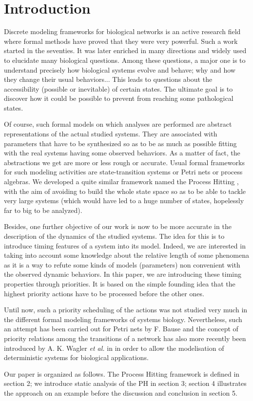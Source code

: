 \section{Introduction}
\label{sec:intro}

Discrete modeling frameworks for biological networks is an active research field where formal methods have proved that they were very powerful.
Such a work started in the seventies.
It was later enriched in many directions and widely used to elucidate many biological questions.
Among these questions, a major one is to understand precisely how biological systems evolve and behave; why and how they change their usual behaviors...
This leads to questions about the accessibility (possible or inevitable) of certain states.
The ultimate goal is to discover how it could be possible to prevent from reaching some pathological states.

Of course, such formal models on which analyses are performed are abstract representations of the actual studied systems.
They are associated with parameters that have to be synthesized so as to be as much as possible fitting with the real systems having some observed behaviors.
As a matter of fact, the abstractions we get are more or less rough or accurate.
Usual formal frameworks for such modeling activities are state-transition systems or Petri nets or process algebras.
We developed a quite similar framework named the Process Hitting \cite{PMR10-TCSB}, with the aim of avoiding to build the whole state space so as to be able to tackle very large systems (which would have led to a huge number of states, hopelessly far to big to be analyzed).

Besides, one further objective of our work is now to be more accurate in the description of the dynamics of the studied systems.
The idea for this is to introduce timing features of a system into its model.
Indeed, we are interested in taking into account some knowledge about the relative length of some phenomena as it is a way to refute some kinds of models (parameters) non convenient with the observed dynamic behaviors.
In this paper, we are introducing these timing properties through priorities.
It is based on the simple founding idea that the highest priority actions have to be processed before the other ones.

Until now, such a priority scheduling of the actions was not studied very much in the different formal modeling frameworks of systems biology.
Nevertheless, such an attempt has been carried out for Petri nets by F. Bause \cite{Bause97} and the concept of priority relations among the transitions of a network has also more recently been introduced by A. K. Wagler \textit{et al.} in \cite{waw,WaglerW12} in order to allow the modelisation of deterministic systems for biological applications.

Our paper is organized as follows.
The Process Hitting framework is defined in section 2;
we introduce static analysis of the PH in section 3;
section 4 illustrates the approach on an example
before the discussion and conclusion in section 5.
